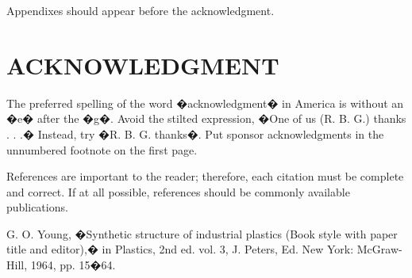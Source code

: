 \documentclass[letterpaper, 10 pt, conference]{ieeeconf}  %
\begin{document}
Appendixes should appear before the acknowledgment.

\section*{ACKNOWLEDGMENT}

The preferred spelling of the word �acknowledgment� in America is without an �e� after the �g�. Avoid the stilted expression, �One of us (R. B. G.) thanks . . .�  Instead, try �R. B. G. thanks�. Put sponsor acknowledgments in the unnumbered footnote on the first page.




References are important to the reader; therefore, each citation must be complete and correct. If at all possible, references should be commonly available publications.



\begin{thebibliography}{99}

 G. O. Young, �Synthetic structure of industrial plastics (Book style with paper title and editor),� 	in Plastics, 2nd ed. vol. 3, J. Peters, Ed.  New York: McGraw-Hill, 1964, pp. 15�64.
\end{thebibliography}
\end{document}
